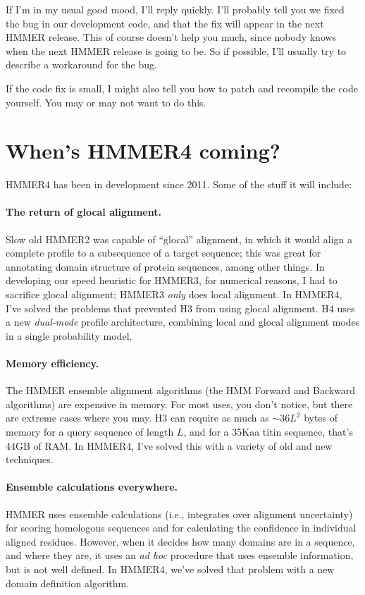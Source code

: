 If I'm in my usual good mood, I'll reply quickly.  I'll probably
tell you we fixed the bug in our development code, and that the fix
will appear in the next HMMER release. This of course doesn't help you
much, since nobody knows when the next HMMER release is going to be.
So if possible, I'll usually try to describe a workaround for the
bug.

If the code fix is small, I might also tell you how to patch and
recompile the code yourself. You may or may not want to do this.






\section{When's HMMER4 coming?}

HMMER4 has been in development since 2011. Some of the stuff it will include:

\paragraph{The return of glocal alignment.} Slow old HMMER2 was
 capable of ``glocal'' alignment, in which it would align a complete
 profile to a subsequence of a target sequence; this was great for
 annotating domain structure of protein sequences, among other things.
 In developing our speed heuristic for HMMER3, for numerical reasons,
 I had to sacrifice glocal alignment; HMMER3 \emph{only} does local
alignment. In HMMER4, I've solved the problems that prevented H3 from
using glocal alignment. H4 uses a new \emph{dual-mode} profile
architecture, combining local and glocal alignment modes in a single
probability model.

\paragraph{Memory efficiency.} The HMMER ensemble alignment
algorithms (the HMM Forward and Backward algorithms) are expensive in
memory. For most uses, you don't notice, but there are extreme cases
where you may. H3 can require as much as $\sim 36L^2$ bytes of memory
for a query sequence of length $L$, and for a 35Kaa titin sequence,
that's 44GB of RAM. In HMMER4, I've solved this with a variety of old
and new techniques.

\paragraph{Ensemble calculations everywhere.} HMMER uses ensemble
calculations (i.e., integrates over alignment uncertainty) for scoring
homologous sequences and for calculating the confidence in individual
aligned residues. However, when it decides how many domains are in a
sequence, and where they are, it uses an \emph{ad hoc} procedure that
uses ensemble information, but is not well defined. In HMMER4, we've
solved that problem with a new domain definition algorithm.

